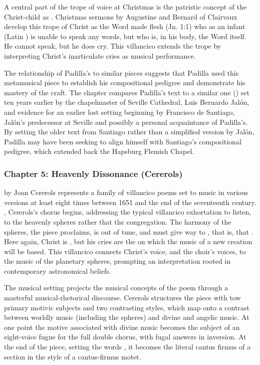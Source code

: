 \documentclass{vcbook-proposal}
\begin{document}
A central part of the trope of voice at Christmas is the patristic concept of the Christ-child as . 
Christmas sermons by Augustine and Bernard of Clairvaux develop this trope of Christ as the Word made flesh (Jn. 1:1) who as an infant (Latin ) is unable to speak any words, but who is, in his body, the Word itself.
He cannot speak, but he does cry.
This villancico extends the trope by interpreting Christ's inarticulate cries as musical performance.

The relationship of Padilla's  to similar pieces suggests that Padilla used this metamusical piece to establish his compositional pedigree and demonstrate his mastery of the craft.
The chapter compares Padilla's text to a similar one () set ten years earlier by the chapelmaster of Seville Cathedral, Luis Bernardo Jalón, and evidence for an earlier lost setting beginning  by Francisco de Santiago, Jalón's predecessor at Seville and possibly a personal acquaintance of Padilla's.
By setting the older text from Santiago rather than a simplified version by Jalón, Padilla may have been seeking to align himself with Santiago's compositional pedigree, which extended back the Hapsburg Flemish Chapel.


\subsubsection{Chapter 5: Heavenly Dissonance (Cererols)}

 by Joan Cererols represents a family of villancico poems set to music in various versions at least eight times between 1651 and the end of the seventeenth century.
, Cererols's chorus begins, addressing the typical villancico exhortation to listen, to the heavenly spheres rather that the congregation. 
The harmony of the spheres, the piece proclaims, is out of tune, and must give way to , that is,  that .
Here again, Christ is , but his cries are the  on which the music of a new creation will be based.
This villancico connects Christ's voice, and the choir's voices, to the music of the planetary spheres, prompting an interpretation rooted in contemporary astronomical beliefs.

The musical setting projects the musical concepts of the poem through a masterful musical-rhetorical discourse.
Cererols structures the piece with tow primary motivic subjects and two contrasting styles, which map onto a contrast between worldly music (including the spheres) and divine and angelic music. 
At one point the motive associated with divine music becomes the subject of an eight-voice fugue for the full double chorus, with fugal answers in inversion.
At the end of the piece, setting the words , it becomes the literal cantus firmus of a section in the style of a cantus-firmus motet.
\end{document}

